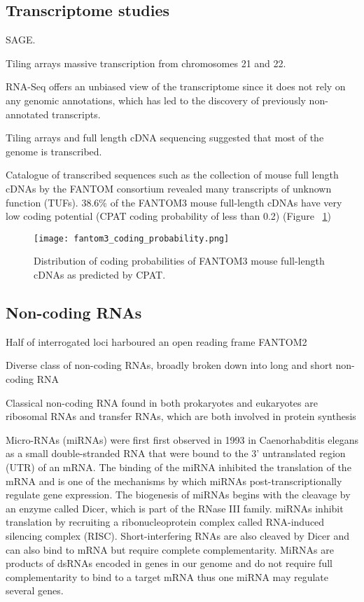 \subsection{Transcriptome studies}

SAGE\cite{pmid9008165}.

Tiling arrays massive transcription from chromosomes 21 and 22.

RNA-Seq offers an unbiased view of the transcriptome since it does not rely on any genomic annotations, which has led to the discovery of previously non-annotated transcripts.

Tiling arrays and full length cDNA sequencing suggested that most of the genome is transcribed.

Catalogue of transcribed sequences such as the collection of mouse full length cDNAs by the FANTOM consortium revealed many transcripts of unknown function (TUFs)\cite{pmid16141072}. 38.6\% of the FANTOM3 mouse full-length cDNAs have very low coding potential (CPAT coding probability of less than 0.2) (Figure ~\ref{fig:fantom3_coding_prob})

\begin{figure}[!ht]
   \centering
   \texttt{[image: fantom3\_coding\_probability.png]}
   \caption[Coding probability of FANTOM3 mouse cDNAs]{Distribution of coding probabilities of FANTOM3 mouse full-length cDNAs as predicted by CPAT\cite{tang2014fantom3codingprob}.}
   \label{fig:fantom3_coding_prob}
\end{figure}

\subsection{Non-coding RNAs}

Half of interrogated loci harboured an open reading frame FANTOM2\cite{pmid12466851}

Diverse class of non-coding RNAs, broadly broken down into long and short non-coding RNA

Classical non-coding RNA found in both prokaryotes and eukaryotes are ribosomal RNAs and transfer RNAs, which are both involved in protein synthesis

Micro-RNAs (miRNAs) were first first observed in 1993 in Caenorhabditis elegans\cite{pmid8252621} as a small double-stranded RNA that were bound to the 3' untranslated region (UTR) of an mRNA. The binding of the miRNA inhibited the translation of the mRNA and is one of the mechanisms by which miRNAs post-transcriptionally regulate gene expression. The biogenesis of miRNAs begins with the cleavage by an enzyme called Dicer\cite{pmid11201747}, which is part of the RNase III family. miRNAs inhibit translation by recruiting a ribonucleoprotein complex called RNA-induced silencing complex (RISC). Short-interfering RNAs are also cleaved by Dicer and can also bind to mRNA but require complete complementarity. MiRNAs are products of dsRNAs encoded in genes in our genome and do not require full complementarity to bind to a target mRNA thus one miRNA may regulate several genes.

